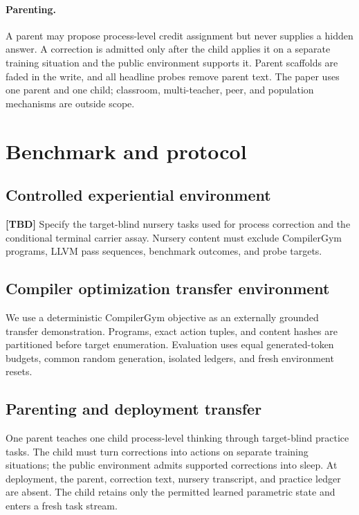 \documentclass{article}
\newcommand{\tbd}{\textbf{[TBD]}}
\begin{document}
\paragraph{Parenting.}
A parent may propose process-level credit assignment but never supplies a
hidden answer. A correction is admitted only after the child applies it on a
separate training situation and the public environment supports it. Parent
scaffolds are faded in the write, and all headline probes remove parent text.
The paper uses one parent and one child; classroom, multi-teacher, peer, and
population mechanisms are outside scope.

\section{Benchmark and protocol}

\subsection{Controlled experiential environment}
\tbd{} Specify the target-blind nursery tasks used for process correction and
the conditional terminal carrier assay. Nursery content must exclude
CompilerGym programs, LLVM pass sequences, benchmark outcomes, and probe
targets.

\subsection{Compiler optimization transfer environment}
We use a deterministic CompilerGym objective as an externally grounded
transfer demonstration. Programs, exact action tuples, and content hashes are
partitioned before target enumeration. Evaluation uses equal generated-token
budgets, common random generation, isolated ledgers, and fresh environment
resets.

\subsection{Parenting and deployment transfer}

One parent teaches one child process-level thinking through target-blind
practice tasks. The child must turn corrections into actions on separate
training situations; the public environment admits supported corrections into
sleep. At deployment, the parent, correction text, nursery transcript, and
practice ledger are absent. The child retains only the permitted learned
parametric state and enters a fresh task stream.
\end{document}
